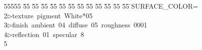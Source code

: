 %
%
\begin{tabbing}
55555 \= 55 \= 55 \= 55 \= 55 \= 55 \= 55 \= 55 \= 55 \= 55 \= 55 \= 55 \= 55 \= \>SURFACE\_COLOR=\\[0pt]
2\>$\triangleright$\>texture\ pigment\ White*05\ \ \ \\[0pt]
3\>$\triangleright$\>finish\ ambient\ 04\ diffuse\ 05\ roughness\ 0001\ \\[0pt]
4\>$\triangleright$\>reflection\ 01\ specular\ 8\ \\[0pt]
5\>\end{tabbing}
